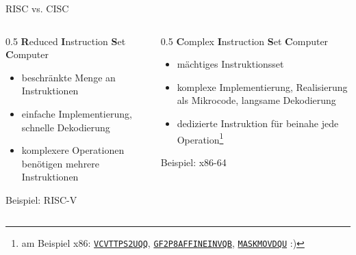 \begin{frame}[c]{RISC vs. CISC}{}
	\begin{columns}
		\begin{column}{0.5\textwidth}
			\centering\textbf{R}educed \textbf{I}nstruction \textbf{S}et \textbf{C}omputer
			\vspace{0.5\baselineskip}
			\begin{itemize}
				\item beschränkte Menge an Instruktionen
				\item einfache Implementierung, schnelle Dekodierung
				\item komplexere Operationen benötigen mehrere Instruktionen
			\end{itemize}
			\vspace{0.5\baselineskip}
			Beispiel: RISC-V
		\end{column}
		\begin{column}{0.5\textwidth}
			\centering\textbf{C}omplex \textbf{I}nstruction \textbf{S}et \textbf{C}omputer
			\vspace{0.5\baselineskip}
			\begin{itemize}
				\item mächtiges Instruktionsset
				\item komplexe Implementierung, Realisierung als Mikrocode, langsame Dekodierung
				\item dedizierte Instruktion für beinahe jede Operation\footnote[frame]{am Beispiel x86: \href{https://www.felixcloutier.com/x86/vcvttps2uqq}{\texttt{VCVTTPS2UQQ}}, \href{https://www.felixcloutier.com/x86/gf2p8affineinvqb}{\texttt{GF2P8AFFINEINVQB}}, \href{https://www.felixcloutier.com/x86/maskmovdqu}{\texttt{MASKMOVDQU}} :)}
			\end{itemize}
			\vspace{0.5\baselineskip}
			Beispiel: x86-64
		\end{column}
	\end{columns}
\end{frame}

